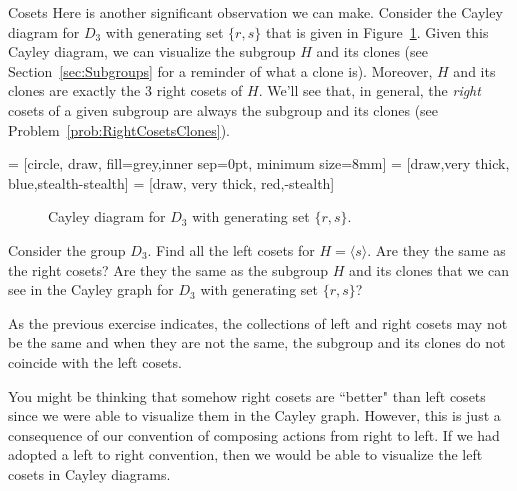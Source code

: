 \begin{section}{Cosets}
Here is another significant observation we can make.  Consider the Cayley diagram for $D_3$ with generating set $\{r,s\}$ that is given in Figure~\ref{fig:D3_repeat}. Given this Cayley diagram, we can visualize the subgroup $H$ and its clones (see Section~\ref{sec:Subgroups} for a reminder of what a clone is).  Moreover, $H$ and its clones are exactly the 3 right cosets of $H$.  We'll see that, in general, the \emph{right} cosets of a given subgroup are always the subgroup and its clones (see Problem~\ref{prob:RightCosetsClones}).

 = [circle, draw, fill=grey,inner sep=0pt, minimum size=8mm]
 = [draw,very  thick, blue,stealth-stealth]
 = [draw, very thick, red,-stealth]

\begin{figure}[!ht]
\centering
{}
\caption{Cayley diagram for $D_3$ with generating set $\{r,s\}$.}
\label{fig:D3_repeat}
\end{figure}

\begin{problem}\label{prob:left_cosets_D3}
Consider the group $D_3$.  Find all the left cosets for $H=\langle s\rangle$.  Are they the same as the right cosets?  Are they the same as the subgroup $H$ and its clones that we can see in the Cayley graph for $D_3$ with generating set $\{r,s\}$?
\end{problem}

As the previous exercise indicates, the collections of left and right cosets may not be the same and when they are not the same, the subgroup and its clones do not coincide with the left cosets.

You might be thinking that somehow right cosets are ``better" than left cosets since we were able to visualize them in the Cayley graph.  However, this is just a consequence of our convention of composing actions from right to left.  If we had adopted a left to right convention, then we would be able to visualize the left cosets in Cayley diagrams.  


\end{section}
